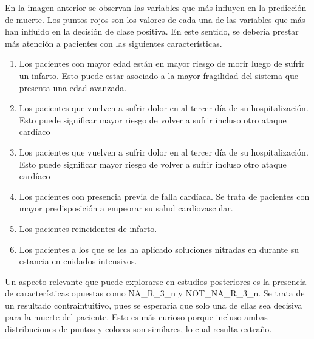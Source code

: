 \documentclass[conference]{IEEEtran}
\begin{document}
En la imagen anterior se observan las variables que más influyen en la predicción de muerte. Los puntos rojos son los valores de cada una de las variables que más han influido en la decisión de clase positiva. En este sentido, se debería prestar más atención a pacientes con las siguientes características.
\begin{enumerate}
    \item Los pacientes con mayor edad están en mayor riesgo de morir luego de sufrir un infarto. Esto puede estar asociado a la mayor fragilidad del sistema que presenta una edad avanzada.
    \item Los pacientes que vuelven a sufrir dolor en al tercer día de su hospitalización. Esto puede significar mayor riesgo de volver a sufrir incluso otro ataque cardíaco
    \item Los pacientes que vuelven a sufrir dolor en al tercer día de su hospitalización. Esto puede significar mayor riesgo de volver a sufrir incluso otro ataque cardíaco
    \item Los pacientes con presencia previa de falla cardíaca. Se trata de pacientes con mayor predisposición a empeorar su salud cardiovascular. 
    \item Los pacientes reincidentes de infarto.
    \item Los pacientes a los que se les ha aplicado soluciones nitradas en durante su estancia en cuidados intensivos.
\end{enumerate}
Un aspecto relevante que puede explorarse en estudios posteriores es la presencia de características opuestas como NA\_R\_3\_n y NOT\_NA\_R\_3\_n. Se trata de un resultado contraintuitivo, pues se esperaría que solo una de ellas sea decisiva para la muerte del paciente. Esto es más curioso porque incluso ambas distribuciones de puntos y colores son similares, lo cual resulta extraño.
\end{document}
